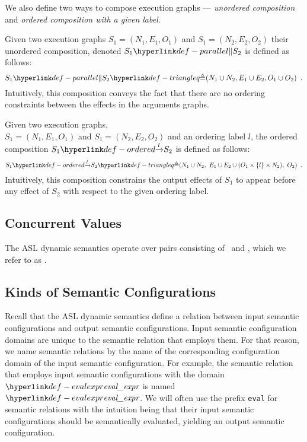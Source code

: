 We also define two ways to compose execution graphs --- \emph{unordered composition} and
\emph{ordered composition with a given label}.

\hypertarget{def-parallel}{}
\begin{definition}
Given two execution graphs $S_1 = (N_1, E_1, O_1)$ and $S_1 = (N_2, E_2, O_2)$ their unordered composition,
denoted $S_1 \parallelcomp S_2$ is defined as follows:
\[
  S_1 \parallelcomp S_2\triangleq (N_1 \cup N_2, E_1 \cup E_2, O_1 \cup O_2) \enspace.
\]
Intuitively, this composition conveys the fact that there are no ordering constraints between the effects
in the arguments graphs.
\end{definition}

\hypertarget{def-ordered}{}
\begin{definition}
Given two execution graphs, \\ $S_1 = (N_1, E_1, O_1)$ and $S_1 = (N_2, E_2, O_2)$ and an ordering label $l$,
the ordered composition $\ordered{S_1}{l}{S_2}$ is defined as follows:
\[
  \ordered{S_1}{l}{S_2} \triangleq (N_1 \cup N_2,\ E_1 \cup E_2 \cup (O_1 \times \{l\} \times N_2),\ O_2) \enspace.
\]
Intuitively, this composition constrains the output effects of $S_1$ to appear before any effect of $S_2$ with respect
to the given ordering label.
\end{definition}

\subsection{Concurrent Values\label{sec:ConcurrentValues}}
\hypertarget{def-concurrentnativevalue}{}
The ASL dynamic semantics operate over pairs consisting of \nativevalues\ and \executiongraphs,
which we refer to as \concurrentnativevalues.

\subsection{Kinds of Semantic Configurations\label{sec:KindsOfSemanticConfigurations}}

Recall that the ASL dynamic semantics define a relation between input semantic configurations and output semantic configurations.
Input semantic configuration domains are unique to the semantic relation that employs them.
For that reason, we name semantic relations by the name of the corresponding configuration domain of the input semantic configuration.
For example, the semantic relation that employs input semantic configurations with the domain $\evalexprname$
is named $\evalexprname$.
%
We will often use the prefix \texttt{eval} for semantic relations with the intuition being that their input semantic configurations
should be semantically evaluated, yielding an output semantic configuration.

